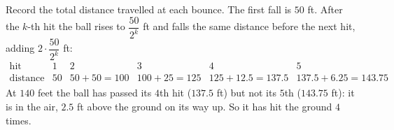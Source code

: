 Record the total distance travelled at each bounce. The first fall is $50$ ft. After the $k$-th hit the ball rises to $\dfrac{50}{2^k}$ ft and falls the same distance before the next hit, adding $2\cdot\dfrac{50}{2^k}$ ft:
\[
\begin{array}{c|ccccc}
\text{hit} & 1 & 2 & 3 & 4 & 5\\ \hline
\text{distance at the hit (ft)} & 50 & 50+50=100 & 100+25=125 & 125+12.5=137.5 & 137.5+6.25=143.75
\end{array}
\]
At $140$ feet the ball has passed its $4$th hit ($137.5$ ft) but not its $5$th ($143.75$ ft): it is in the air, $2.5$ ft above the ground on its way up. So it has hit the ground $\boxed{4}$ times.
